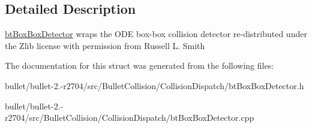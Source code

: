 \subsection{Detailed Description}
\hyperlink{structbt_box_box_detector}{bt\+Box\+Box\+Detector} wraps the O\+D\+E box-\/box collision detector re-\/distributed under the Zlib license with permission from Russell L. Smith 

The documentation for this struct was generated from the following files\+:\begin{DoxyCompactItemize}
\item 
bullet/bullet-\/2.-\/r2704/src/\+Bullet\+Collision/\+Collision\+Dispatch/bt\+Box\+Box\+Detector.\+h\item 
bullet/bullet-\/2.-\/r2704/src/\+Bullet\+Collision/\+Collision\+Dispatch/bt\+Box\+Box\+Detector.\+cpp\end{DoxyCompactItemize}
